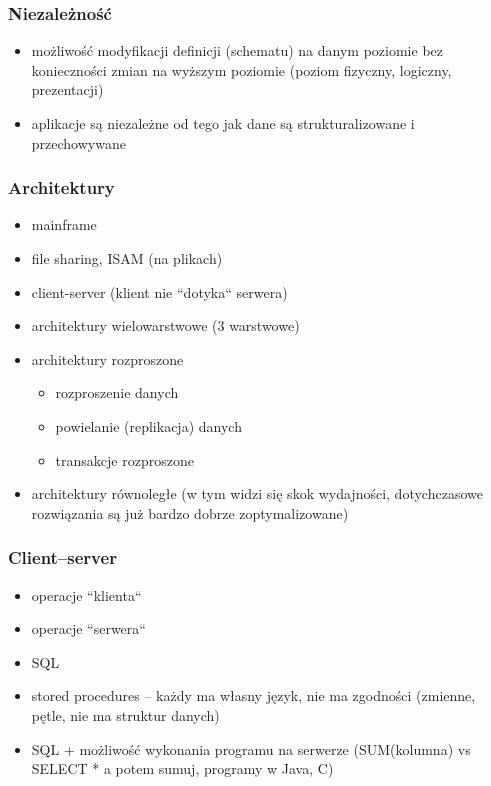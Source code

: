 \documentclass[12pt]{article}
\begin{document}
\subsubsection{Niezależność}
\begin{itemize}
\item możliwość modyfikacji definicji (schematu) na danym poziomie bez konieczności zmian na wyższym poziomie
   (poziom fizyczny, logiczny, prezentacji)
\item aplikacje są niezależne od tego jak dane są strukturalizowane i przechowywane
\end{itemize}

\subsubsection{Architektury}
\begin{itemize}
\item  mainframe
\item  file sharing, \acs{ISAM} (na plikach)
\item  client-server (klient nie ``dotyka`` serwera)
\item  architektury wielowarstwowe (3 warstwowe)
\item  architektury rozproszone
\begin{itemize}
\item  rozproszenie danych
\item powielanie (replikacja) danych
\item transakcje rozproszone
\end{itemize}
\item  architektury równoległe (w tym widzi się skok wydajności, dotychczasowe rozwiązania są już
   bardzo dobrze zoptymalizowane)
\end{itemize}

\subsubsection{Client--server}
\begin{itemize}
\item operacje ``klienta``
\item operacje ``serwera``
\item \ac{SQL}
\item stored procedures -- każdy ma własny język, nie ma zgodności (zmienne, pętle, nie ma struktur danych)
\item \ac{SQL} + możliwość wykonania programu na serwerze (SUM(kolumna) vs SELECT * a potem sumuj, programy w Java, C)
\end{itemize}
\end{document}
